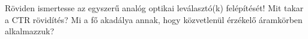 \begin{example}

Röviden ismertesse az egyszerű analóg optikai leválasztó(k) felépítését! Mit takar a CTR rövidítés? Mi a fő akadálya annak, hogy közvetlenül érzékelő áramkörben alkalmazzuk?

\tcbline
\vspace{1mm}

\solution

\end{example}